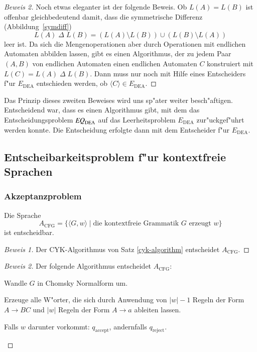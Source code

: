 \begin{proof}[Beweis 2]
Noch etwas eleganter ist der folgende Beweis. Ob $L(A)=L(B)$ ist
offenbar gleichbedeutend damit, dass die symmetrische Differenz
(Abbildung~\ref{symdiff})
\[
L(A){\;\Delta\;} L(B)=
(L(A)\setminus L(B)) \cup (L(B)\setminus L(A))
\]
leer ist.
Da sich die Mengenoperationen aber durch Operationen mit
endlichen Automaten abbilden lassen, gibt es einen Algorithmus,
der  zu jedem Paar $(A,B)$
von endlichen Automaten  einen endlichen Automaten $C$ konstruiert mit
$L(C)=L(A){\;\Delta\;} L(B)$. Dann muss nur noch mit Hilfe eines Entscheiders
f"ur $E_{\text{DEA}}$ entschieden werden, ob $\langle C\rangle\in
E_{\text{DEA}}$.
\end{proof}

Das Prinzip dieses zweiten Beweises wird uns sp"ater weiter besch"aftigen.
Entscheidend war, dass es einen Algorithmus gibt, mit dem das
Entscheidungsproblem 
$\text{\it EQ}_{\text{DEA}}$
auf das Leerheitsproblem
$E_{\text{DEA}}$ zur"uckgef"uhrt werden konnte. Die Entscheidung
erfolgte dann mit dem Entscheider f"ur
$E_{\text{DEA}}$.

\subsection{Entscheibarkeitsproblem f"ur kontextfreie Sprachen}
\subsubsection{Akzeptanzproblem}
\begin{satz}
Die Sprache
\[
A_{\text{CFG}}=\{
\langle G,w\rangle\;|\; \text{die kontextfreie Grammatik $G$ erzeugt $w$}
\}
\]
ist entscheidbar.
\end{satz}

\begin{proof}[Beweis 1]
Der CYK-Algorithmus von Satz \ref{cyk-algorithm} entscheidet
$A_{\text{CFG}}$.
\end{proof}

\begin{proof}[Beweis 2]
Der folgende Algorithmus entscheidet
$A_{\text{CFG}}$:
\medskip
\begin{compactenum}
\item Wandle $G$ in Chomsky Normalform um.
\item Erzeuge alle W"orter, die sich durch Anwendung
von $|w|-1$ Regeln der Form $A\to BC$ und $|w|$ Regeln
der Form $A\to a$ ableiten lassen. 
\item Falls $w$ darunter vorkommt: $q_{\text{accept}}$, 
andernfalls $q_{\text{reject}}$.
\end{compactenum}
\medskip
\end{proof}

